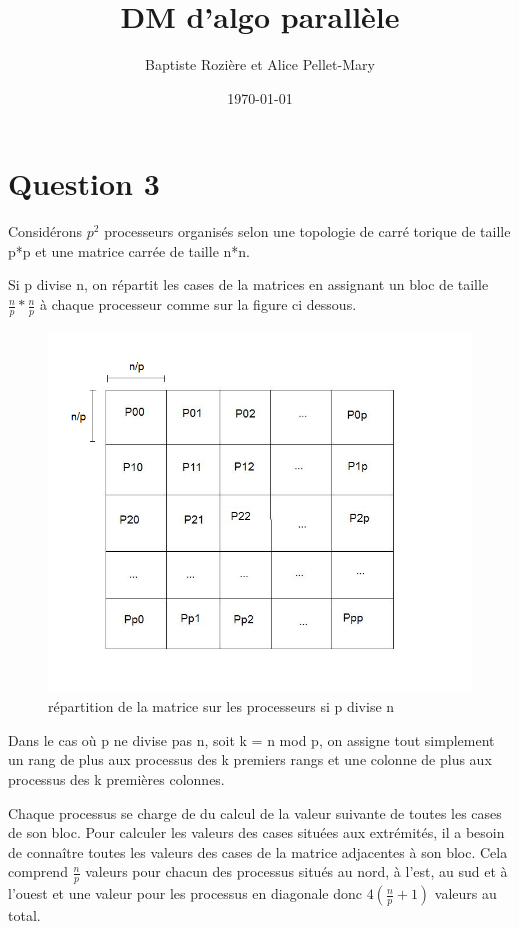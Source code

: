 \documentclass[a4paper,11pt]{article}
\title{DM d'algo parallèle}
\author{Baptiste Rozière et Alice Pellet-Mary}
\date{\today}
\begin{document}
\maketitle

\section*{Question 3}
Considérons $p^2$ processeurs organisés selon une topologie de carré torique de taille p*p et une matrice carrée de taille n*n.

Si p divise n, on répartit les cases de la matrices en assignant un bloc de taille $\frac n p * \frac n p$ à chaque processeur comme sur la figure ci dessous.
\begin{figure}[!h]
  \includegraphics[scale=0.4]{repartition.png}
  \caption{répartition de la matrice sur les processeurs si p divise n}
  \label{repartition}
\end{figure}

Dans le cas où p ne divise pas n, soit k = n mod p, on assigne tout simplement un rang de plus aux processus des k premiers rangs et une colonne de plus aux processus des k premières colonnes.

Chaque processus se charge de du calcul de la valeur suivante de toutes les cases de son bloc. Pour calculer les valeurs des cases situées aux extrémités, il a besoin de connaître toutes les valeurs des cases de la matrice adjacentes à son bloc. Cela comprend $\frac n {p}$ valeurs pour chacun des processus situés au nord, à l'est, au sud et à l'ouest et une valeur pour les processus en diagonale donc $4 (\frac{n} {p}+1)$ valeurs au total. 
\end{document}
